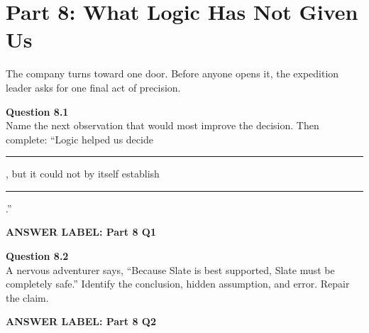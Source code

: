 \documentclass[12pt]{article}
\newcommand{\answerbox}[2]{%
\vspace{0.12em}\noindent\textbf{#1}\par\vspace{0.04em}
\noindent\fbox{\begin{minipage}[t][#2]{\dimexpr\textwidth-2\fboxsep-2\fboxrule}\rule{\textwidth}{0pt}\vspace{#2}\end{minipage}}\par\vspace{0.22em}}
\begin{document}
\newpage

\section*{Part 8: What Logic Has Not Given Us}

The company turns toward one door. Before anyone opens it, the expedition leader asks for one final act of precision.

\textbf{Question 8.1}\\[-0.15em]
Name the next observation that would most improve the decision. Then complete: ``Logic helped us decide \rule{1.6in}{0.4pt}, but it could not by itself establish \rule{1.6in}{0.4pt}.''

\answerbox{ANSWER LABEL: Part 8 Q1}{2.2in}

\textbf{Question 8.2}\\[-0.15em]
A nervous adventurer says, ``Because Slate is best supported, Slate must be completely safe.'' Identify the conclusion, hidden assumption, and error. Repair the claim.

\answerbox{ANSWER LABEL: Part 8 Q2}{2.2in}
\end{document}
